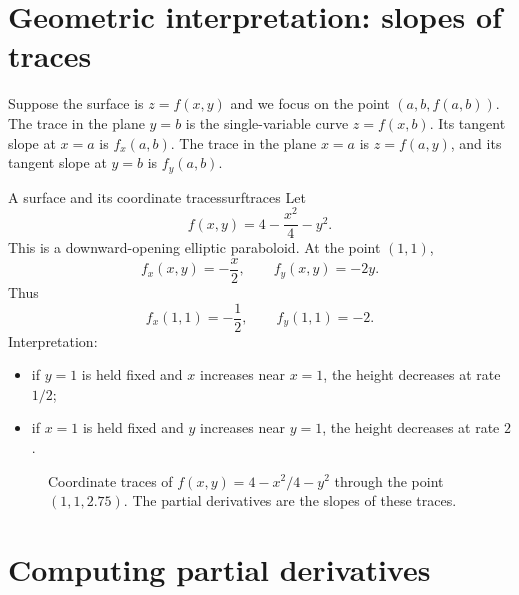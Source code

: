 \documentclass[11pt]{article}
\begin{document}
\section{Geometric interpretation: slopes of traces}

Suppose the surface is $z=f(x,y)$ and we focus on the point $(a,b,f(a,b))$. The trace in the plane $y=b$ is the single-variable curve $z=f(x,b)$. Its tangent slope at $x=a$ is $f_x(a,b)$. The trace in the plane $x=a$ is $z=f(a,y)$, and its tangent slope at $y=b$ is $f_y(a,b)$.

\begin{examplebox}{A surface and its coordinate traces}{surftraces}
Let
\[
f(x,y)=4-\frac{x^2}{4}-y^2.
\]
This is a downward-opening elliptic paraboloid. At the point $(1,1)$,
\[
f_x(x,y)=-\frac{x}{2},\qquad f_y(x,y)=-2y.
\]
Thus
\[
f_x(1,1)=-\frac12,\qquad f_y(1,1)=-2.
\]
Interpretation:
\begin{itemize}
  \item if $y=1$ is held fixed and $x$ increases near $x=1$, the height decreases at rate $1/2$;
  \item if $x=1$ is held fixed and $y$ increases near $y=1$, the height decreases at rate $2$.
\end{itemize}
\end{examplebox}

\begin{figure}[H]
\centering
{}
\caption{Coordinate traces of $f(x,y)=4-x^2/4-y^2$ through the point $(1,1,2.75)$. The partial derivatives are the slopes of these traces.}
\end{figure}

\section{Computing partial derivatives}
\end{document}
